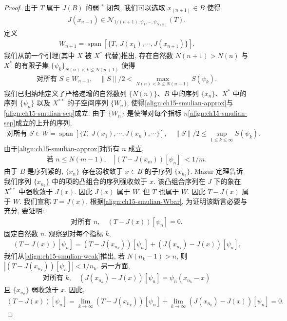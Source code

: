 \documentclass[../../main.tex]{subfiles}
\begin{document}
\begin{proof}
由于 $T$ 属于 $J(B)$ 的弱 $^{*}$ 闭包, 我们可以选取 $x_{(n+1)}\in B$ 使得
\begin{align}
J(x_{n+1})\in\mathcal{N}_{1/(n+1),\psi_{1},\cdots,\psi_{N(n)}}(T).\label{align:ch15-smulian-approx}
\end{align}
定义
\begin{align}
W_{n+1}=\operatorname{span}[\{T,\ J(x_{1}),\cdots,J(x_{n+1})\}].\label{align:ch15-smulian-W}
\end{align}
我们从前一个引理(其中 $X$ 被 $X^{*}$ 代替)推出, 存在自然数 $N(n+1)>N(n)$ 与 $X^{*}$ 的有限子集 $\{\psi_{k}\}_{N(n)<k\leqslant N(n+1)}$ 使得
\begin{align}
\text{对所有 }S\in W_{n+1},\quad\|S\|/2<\max_{N(n)<k\leqslant N(n+1)}S(\psi_{k}).\label{align:ch15-smulian-sep}
\end{align}
我们已归纳地定义了严格递增的自然数列 $\{N(n)\}$、$B$ 中的序列 $\{x_{n}\}$、$X^{*}$ 中的序列 $\{\psi_{n}\}$ 以及 $X^{**}$ 的子空间序列 $\{W_{n}\}$, 使得\eqref{align:ch15-smulian-approx}与\eqref{align:ch15-smulian-sep}成立. 由于 $\{W_{n}\}$ 是使得对每个指标 $n$\eqref{align:ch15-smulian-sep}成立的上升的序列,
\begin{align}
\text{对所有 }S\in W=\overline{\operatorname{span}}[\{T,\ J(x_{1}),\cdots,J(x_{n}),\cdots\}],\quad\|S\|/2\leqslant\sup_{1\leqslant k\leqslant\infty}S(\psi_{k}).\label{align:ch15-smulian-Wbar}
\end{align}
由于\eqref{align:ch15-smulian-approx}对所有 $n$ 成立,
\begin{align}
\text{若 }n\leqslant N(m-1),\quad|(T-J(x_{m}))[\psi_{n}]|<1/m.\label{align:ch15-smulian-weak}
\end{align}
由于 $B$ 是序列紧的, $\{x_{n}\}$ 存在弱收敛于 $x\in B$ 的子序列 $\{x_{n_{k}}\}$. Mazur 定理告诉我们序列 $\{x_{n_{k}}\}$ 中的项的凸组合的序列强收敛于 $x$. 该凸组合序列在 $J$ 下的象在 $X^{**}$ 中强收敛于 $J(x)$. 因此 $J(x)$ 属于 $W$. 但 $T$ 也属于 $W$. 因此 $T-J(x)$ 属于 $W$. 我们宣称 $T=J(x)$. 根据\eqref{align:ch15-smulian-Wbar}, 为证明该断言必要与充分, 要证明:
\begin{align}
\text{对所有 }n,\quad(T-J(x))[\psi_{n}]=0.\label{align:ch15-smulian-zero}
\end{align}
固定自然数 $n$. 观察到对每个指标 $k$,
\begin{align*}
(T-J(x))[\psi_{n}]=(T-J(x_{n_{k}}))[\psi_{n}]+(J(x_{n_{k}})-J(x))[\psi_{n}].
\end{align*}
我们从\eqref{align:ch15-smulian-weak}推出, 若 $N(n_{k}-1)>n$, 则 $|(T-J(x_{n_{k}}))[\psi_{n}]|<1/n_{k}$. 另一方面,
\begin{align*}
\text{对所有 }k,\quad(J(x_{n_{k}})-J(x))[\psi_{n}]=\psi_{n}(x_{n_{k}}-x)
\end{align*}
且 $\{x_{n_{k}}\}$ 弱收敛于 $x$. 因此,
\begin{align*}
(T-J(x))[\psi_{n}]=\lim_{k\to\infty}(T-J(x_{n_{k}}))[\psi_{n}]+\lim_{k\to\infty}(J(x_{n_{k}})-J(x))[\psi_{n}]=0.
\end{align*}
\end{proof}
\end{document}
